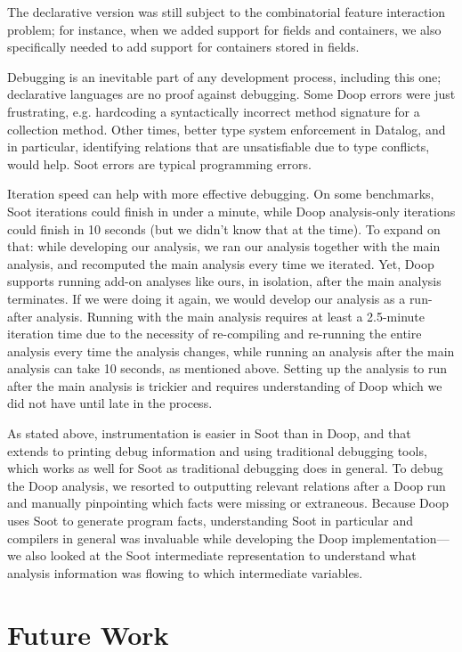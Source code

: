 The declarative version was still subject to the combinatorial feature interaction problem; for instance, when we added support for fields and containers, we also specifically needed to add support for containers stored in fields.

Debugging is an inevitable part of any development process, including this one; declarative languages are no proof against debugging. Some Doop errors were just frustrating, e.g. hardcoding a syntactically incorrect method signature for a collection method. Other times, better type system enforcement in Datalog, and in particular, identifying relations that are unsatisfiable due to type conflicts, would help. Soot errors are typical programming errors.

Iteration speed can help with more effective debugging. On some benchmarks, Soot iterations could finish in under a minute, while Doop analysis-only iterations could finish in 10 seconds (but we didn't know that at the time). To expand on that: while developing our analysis, we ran our analysis together with the main analysis, and recomputed the main analysis every time we iterated. Yet, Doop supports running add-on analyses like ours, in isolation, after the main analysis terminates. If we were doing it again, we would develop our analysis as a run-after analysis. Running with the main analysis requires at least a 2.5-minute iteration time due to the necessity of re-compiling and re-running the entire analysis every time the analysis changes, while running an analysis after the main analysis can take 10 seconds, as mentioned above. Setting up the analysis to run after the main analysis is trickier and requires understanding of Doop which we did not have until late in the process. 

As stated above, instrumentation is easier in Soot than in Doop, and that extends to printing debug information and using traditional debugging tools, which works as well for Soot as traditional debugging does in general. To debug the Doop analysis, we resorted to outputting relevant relations after a Doop run and manually pinpointing which facts were missing or extraneous. Because Doop uses Soot to generate program facts, understanding Soot in particular and compilers in general was invaluable while developing the Doop implementation---we also looked at the Soot intermediate representation to understand what analysis information was flowing to which intermediate variables.


\section{Future Work} 
\label{sec:future-work}

